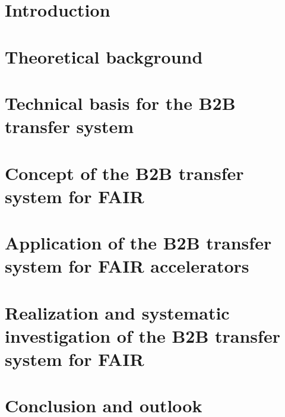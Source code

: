 \documentclass[12pt,twoside]{report}
\begin{document}



\chapter{Introduction}

\chapter{Theoretical background}

%
\chapter{Technical basis for the B2B transfer system}

\chapter{Concept of the B2B transfer system for FAIR ~\cite{bai_concept_2016}}

\chapter{Application of the B2B transfer system for FAIR accelerators}

\chapter{Realization and systematic investigation of the B2B transfer system for FAIR}

%
\chapter{Conclusion and outlook}

\end{document}

